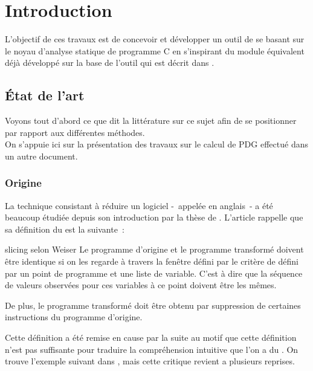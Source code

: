 \chapter{Introduction}


L'objectif de ces travaux est de concevoir et développer un outil de \slicing
se basant sur le noyau \ppc d'analyse statique de programme C
en s'inspirant du module équivalent déjà développé
sur la base de l'outil \caveat qui est décrit dans \cite{slicingCaveat}.



\section{État de l'art}\label{sec-lart}

Voyons tout d'abord
ce que dit la littérature sur ce sujet
afin de se positionner par rapport aux différentes méthodes.\\

On s'appuie ici sur la présentation des travaux sur le calcul de PDG
effectué dans un autre document.

\subsection{Origine}

La technique consistant à réduire un logiciel -~appelée \slicing en anglais~-
a été beaucoup
étudiée depuis son introduction par la thèse de \cite{weiser79}.
L'article \cite{weiser81} rappelle que sa définition du \slicing est
la suivante~:

\begin{definition}{slicing selon Weiser}
Le programme d'origine et le programme transformé doivent être identique
si on les regarde à travers la fenêtre défini par le critère de \slicing
défini par un point de programme et une liste de variable.
C'est à dire que la séquence de valeurs observées pour ces variables
à ce point doivent être les mêmes.

De plus, le programme transformé doit être obtenu par suppression de certaines
instructions du programme d'origine.
\end{definition}

Cette définition a été remise en cause par la suite
au motif que cette définition n'est pas suffisante pour traduire
la compréhension intuitive que l'on a du \slicing.
On trouve l'exemple suivant dans \cite{kumar02better},
mais cette critique revient a plusieurs reprises.


